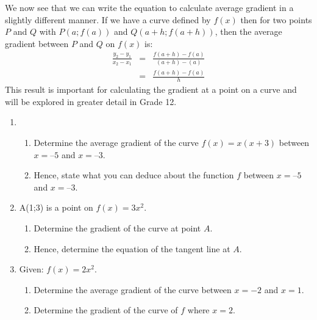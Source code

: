 We now see that we can write the equation to calculate average gradient in a slightly different manner. If we have a curve defined by $f(x)$ then for two points $P$ and $Q$ with $P(a;f(a))$ and $Q(a+h;f(a+h))$, then the average gradient between $P$ and $Q$ on $f(x)$ is:
\begin{eqnarray*}
\frac{y_2-y_1}{x_2-x_1}&=&\frac{f(a+h)-f(a)}{(a+h)-(a)}\\
&=&\frac{f(a+h)-f(a)}{h}
\end{eqnarray*}
This result is important for calculating the gradient at a point on a curve and will be explored in greater detail in Grade 12.

\begin{eocexercises}{}
\begin{enumerate}
\item{}
\begin{enumerate}
\item{Determine the average gradient of the curve $f(x) = x(x+3)$ between $x = 5$ and $x = 3$.}
\item{Hence, state what you can deduce about the function $f$ between $x = 5$ and $x = 3$.}
\end{enumerate}
\item{A(1;3) is a point on $f(x)=3x^2$.}{
\begin{enumerate}
\item{Determine the gradient of the curve at point $A$.}
\item{Hence, determine the equation of the tangent line at $A$.}
\end{enumerate}
}
\item{Given: $f(x)=2x^2$.}{
\begin{enumerate}
\item{Determine the average gradient of the curve between $x=-2$ and $x=1$.}
\item{Determine the gradient of the curve of $f$ where $x=2$.}
\end{enumerate}}
\end{enumerate}



\practiceinfo
\end{eocexercises} 




